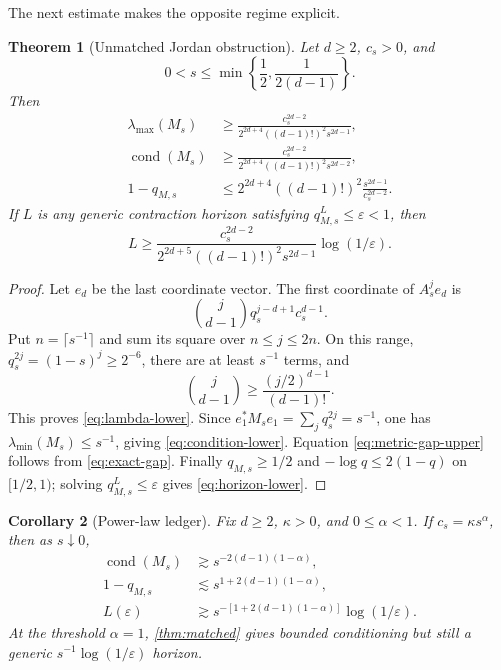 \documentclass[11pt]{article}
\newtheorem{theorem}{Theorem}[section]
\newtheorem{corollary}[theorem]{Corollary}
\newcommand{\cond}{\operatorname{cond}}
\begin{document}
The next estimate makes the opposite regime explicit.

\begin{theorem}[Unmatched Jordan obstruction]
\label{thm:unmatched}
Let $d\ge2$, $c_s>0$, and
\[
 0<s\le\min\left\{\frac12,\frac1{2(d-1)}\right\}.
\]
Then
\begin{align}
 \lambda_{\max}(M_s)
 &\ge
 \frac{c_s^{2d-2}}
 {2^{2d+4}((d-1)!)^2s^{2d-1}},
 \label{eq:lambda-lower}\\
 \cond(M_s)
 &\ge
 \frac{c_s^{2d-2}}
 {2^{2d+4}((d-1)!)^2s^{2d-2}},
 \label{eq:condition-lower}\\
 1-q_{M,s}
 &\le
 2^{2d+4}((d-1)!)^2
 \frac{s^{2d-1}}{c_s^{2d-2}}.
 \label{eq:metric-gap-upper}
\end{align}
If $L$ is any generic contraction horizon satisfying
$q_{M,s}^L\le\varepsilon<1$, then
\begin{equation}
 L\ge
 \frac{c_s^{2d-2}}
 {2^{2d+5}((d-1)!)^2s^{2d-1}}
 \log(1/\varepsilon).
 \label{eq:horizon-lower}
\end{equation}
\end{theorem}

\begin{proof}
Let $e_d$ be the last coordinate vector.  The first coordinate of
$A_s^je_d$ is
\[
 \binom{j}{d-1}q_s^{j-d+1}c_s^{d-1}.
\]
Put $n=\lceil s^{-1}\rceil$ and sum its square over $n\le j\le2n$.
On this range, $q_s^{2j}=(1-s)^j\ge2^{-6}$, there are at least $s^{-1}$
terms, and
\[
 \binom{j}{d-1}\ge
 \frac{(j/2)^{d-1}}{(d-1)!}.
\]
This proves \eqref{eq:lambda-lower}.  Since
$e_1^*M_se_1=\sum_jq_s^{2j}=s^{-1}$, one has
$\lambda_{\min}(M_s)\le s^{-1}$, giving
\eqref{eq:condition-lower}.  Equation \eqref{eq:metric-gap-upper} follows
from \eqref{eq:exact-gap}.  Finally $q_{M,s}\ge1/2$ and
$-\log q\le2(1-q)$ on $[1/2,1)$; solving
$q_{M,s}^L\le\varepsilon$ gives \eqref{eq:horizon-lower}.
\end{proof}

\begin{corollary}[Power-law ledger]
\label{cor:power}
Fix $d\ge2$, $\kappa>0$, and $0\le\alpha<1$.  If
$c_s=\kappa s^\alpha$, then as $s\downarrow0$,
\begin{align}
 \cond(M_s)&\gtrsim
 s^{-2(d-1)(1-\alpha)},\label{eq:cond-power}\\
 1-q_{M,s}&\lesssim
 s^{1+2(d-1)(1-\alpha)},\label{eq:gap-power}\\
 L(\varepsilon)&\gtrsim
 s^{-[1+2(d-1)(1-\alpha)]}\log(1/\varepsilon).
 \label{eq:horizon-power}
\end{align}
At the threshold $\alpha=1$, \cref{thm:matched} gives bounded
conditioning but still a generic $s^{-1}\log(1/\varepsilon)$ horizon.
\end{corollary}
\end{document}

